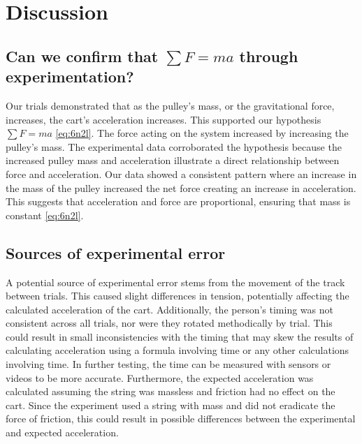 ﻿\documentclass[reprint,amsmath,amssymb.aps]{revtex4-2}
\begin{document}
\section{Discussion}

\subsection{Can we confirm that $\sum F=ma$ through experimentation?}
Our trials demonstrated that as the pulley's mass, or the gravitational force, increases, the cart's acceleration increases. This supported our hypothesis $\sum F = ma$ \cref{eq:6n2l}. The force acting on the system increased by increasing the pulley's mass. The experimental data corroborated the hypothesis because the increased pulley mass and acceleration illustrate a direct relationship between force and acceleration. Our data showed a consistent pattern where an increase in the mass of the pulley increased the net force creating an increase in acceleration. This suggests that acceleration and force are proportional, ensuring that mass is constant \cref{eq:6n2l}. 

\subsection{Sources of experimental error}
A potential source of experimental error stems from the movement of the track between trials. This caused slight differences in tension, potentially affecting the calculated acceleration of the cart. Additionally, the person's timing was not consistent across all trials, nor were they rotated methodically by trial. This could result in small inconsistencies with the timing that may skew the results of calculating acceleration using a formula involving time or any other calculations involving time. In further testing, the time can be measured with sensors or videos to be more accurate. Furthermore, the expected acceleration was calculated assuming the string was massless and friction had no effect on the cart. Since the experiment used a string with mass and did not eradicate the force of friction, this could result in possible differences between the experimental and expected acceleration.
\end{document}
